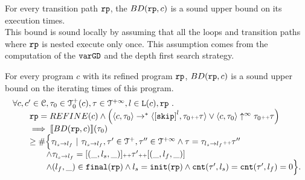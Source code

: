 For every transition path $\mathtt{rp}$, the $BD(\mathtt{rp}, c)$
is a sound upper bound on its execution times.
\\
This bound is sound locally by assuming
that all the loops and transition paths where $\mathtt{rp}$ is nested execute only once.
This assumption comes from the computation of the $\mathtt{varGD}$ and the depth first search strategy.
\\
%
\begin{lemma}
    For every program $c$ with its refined program $\mathtt{rp}$,
    $BD(\mathtt{rp}, c)$ is a sound upper bound on the iterating times of this program.
    \[
      \begin{array}{l}
      \forall c, c' \in \cdom, \trace_0 \in \ftdom_0(c), \trace \in \tdom, l \in \lvar(c), \rprog \st 
      \\ \qquad
      \rprog = REFINE(c)
      \land 
      \Big(
        \config{c, \trace_0} \to^* \config{\clabel{\eskip}^{l}, \trace_0 \tracecat \trace}
        \lor \config{c, \trace_0} \uparrow^{\infty} \trace_0 \tracecat \trace 
        \Big)
      \\ \qquad
      \implies
      \econfig{BD(\rprog, c)}(\trace_0) 
      \\ \qquad \geq 
      \# \Big\{\trace_{l_s \to l_f} ~\vert~ \trace_{l_s \to l_f}, \trace'\in \ftdom, \trace'' \in \tdom
      \land \trace = \trace_{l_s \to l_f} \tracecat \trace''
      \\ \qquad \qquad
      \land \trace_{l_s \to l_f} = [(\_, l_s, \_)] \tracecat \trace' \tracecat [(\_, l_f, \_)]
      \\ \qquad \qquad
      \land (l_{f}, \_) \in \absfinal(\rprog)
      \land l_s = \absinit(\rprog)
      \land \counter(\trace', l_s) = \counter(\trace', l_f) = 0 
      \Big\}.
      \end{array}
    \]
    \end{lemma}

